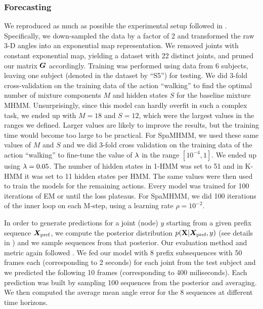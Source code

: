 \subsubsection{Forecasting}

We reproduced as much as possible the experimental setup followed in \citet{Fragkiadaki2015}. Specifically, we down-sampled the data by a factor of 2 and transformed the raw 3-D angles into an exponential map representation. We removed joints with constant exponential map, yielding a dataset with 22 distinct joints, and pruned our matrix ${\bm{G}}$ accordingly. Training was performed using data from 6 subjects, leaving one subject (denoted in the dataset by ``S5'') for testing. We did 3-fold cross-validation on the training data of the action ``walking'' to find the optimal number of mixture components $M$ and hidden states $S$ for the baseline mixture MHMM. Unsurprisingly, since this model can hardly overfit in such a complex task, we ended up with $M=18$ and $S=12$, which were the largest values in the ranges we defined. Larger values are likely to improve the results, but the training time would become too large to be practical. For SpaMHMM, we used these same values of $M$ and $S$ and we did 3-fold cross validation on the training data of the action ``walking'' to fine-tune the value of $\lambda$ in the range $[10^{-4}, 1]$. We ended up using $\lambda=0.05$. The number of hidden states in 1-HMM was set to 51 and in K-HMM it was set to 11 hidden states per HMM. The same values were then used to train the models for the remaining actions. Every model was trained for 100 iterations of EM  or until the loss plateaus. For SpaMHMM, we did 100 iterations of the inner loop on each M-step, using a learning rate $\rho=10^{-2}$.

In order to generate predictions for a joint (node) $y$ starting from a given prefix sequence ${\bm{X}}_{\text{pref}}$, we compute the posterior distribution $p({\mathbf{X}} | {\bm{X}}_{\text{pref}}, y)$ (see details in ) and we sample sequences from that posterior. Our evaluation method and metric again followed \citet{Fragkiadaki2015}. We fed our model with 8 prefix subsequences with 50 frames each (corresponding to 2 seconds) for each joint from the test subject and we predicted the following 10 frames (corresponding to 400 miliseconds). Each prediction was built by sampling 100 sequences from the posterior and averaging. We then computed the average mean angle error for the 8 sequences at different time horizons. 

